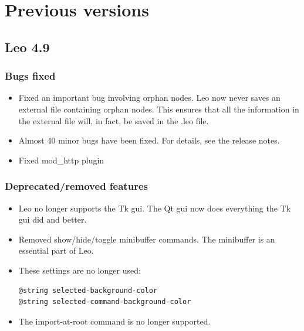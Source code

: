 \documentclass[a4paper,10pt,english]{sphinxmanual}
\begin{document}
\section{Previous versions}
\label{what-is-new:previous-versions}

\subsection{Leo 4.9}
\label{what-is-new:leo-4-9}

\subsubsection{Bugs fixed}
\label{what-is-new:id1}\begin{itemize}
\item {} 
Fixed an important bug involving orphan nodes. Leo now never saves an external
file containing orphan nodes. This ensures that all the information in the
external file will, in fact, be saved in the .leo file.

\item {} 
Almost 40 minor bugs have been fixed. For details, see the release notes.

\item {} 
Fixed mod\_http plugin

\end{itemize}


\subsubsection{Deprecated/removed features}
\label{what-is-new:deprecated-removed-features}\begin{itemize}
\item {} 
Leo no longer supports the Tk gui. The Qt gui now does everything
the Tk gui did and better.

\item {} 
Removed show/hide/toggle minibuffer commands. The minibuffer is an essential
part of Leo.

\item {} 
These settings are no longer used:

\begin{Verbatim}[commandchars=\\\{\}]
@string selected-background-color
@string selected-command-background-color
\end{Verbatim}

\item {} 
The import-at-root command is no longer supported.

\end{itemize}
\end{document}
